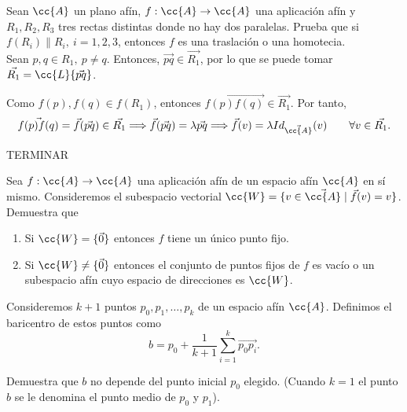 \begin{ejercicio}
    Sean $\cc{A}$ un plano afín, $f : \cc{A} \to \cc{A}$ una aplicación afín y ${R}_1, {R}_2, {R}_3$ tres rectas distintas donde no hay dos paralelas. Prueba que si $f(R_i) \| R_i,~i = 1, 2, 3$, entonces $f$ es una traslación o una homotecia.\\

    Sean $p,q\in R_1,~p\neq q$. Entonces, $\vec{pq}\in \vec{R_1}$, por lo que se puede tomar $\vec{R_1}=\cc{L}\{\vec{pq}\}$.
    
    Como $f(p), f(q)\in f(R_1)$, entonces $\vec{f(p)f(q)}\in \vec{R_1}$. Por tanto,
    \begin{equation*}
        \vec{f(p)f(q)} = \vec{f}(\vec{pq}) \in \vec{R_1}
        \Longrightarrow \vec{f}(\vec{pq}) = \lambda \vec{pq}
        \Longrightarrow \vec{f}(v)=\lambda Id_{\vec{\cc{A}}}(v) \qquad \forall v\in \vec{R_1}.
    \end{equation*}

    TERMINAR
\end{ejercicio}

\begin{ejercicio}
    Sea $f : \cc{A} \to \cc{A}$ una aplicación afín de un espacio afín  $\cc{A}$ en sí mismo. Consideremos el subespacio vectorial $\cc{W} = \{v \in \vec{\cc{A}} \mid \vec{f}(v) = v\}$. Demuestra que
    \begin{enumerate}
        \item Si $\cc{W} = \{\vec{0}\}$ entonces $f$ tiene un único punto fijo.
        
        \item Si $\cc{W} \neq \{\vec{0}\}$ entonces el conjunto de puntos fijos de $f$ es vacío o un subespacio afín cuyo espacio de direcciones es $\cc{W}$.
    \end{enumerate}
\end{ejercicio}

\begin{ejercicio}
    Consideremos $k + 1$ puntos $p_0, p_1, \dots , p_k$ de un espacio afín $\cc{A}$. Definimos el baricentro de estos puntos como
    \begin{equation*}
        b=p_0+\frac{1}{k+1} \sum_{i=1}^k \vec{p_0p_i}.
    \end{equation*}

    Demuestra que $b$ no depende del punto inicial $p_0$ elegido. (Cuando $k = 1$ el punto $b$ se le denomina el punto medio de $p_0$ y $p_1$).
\end{ejercicio}

